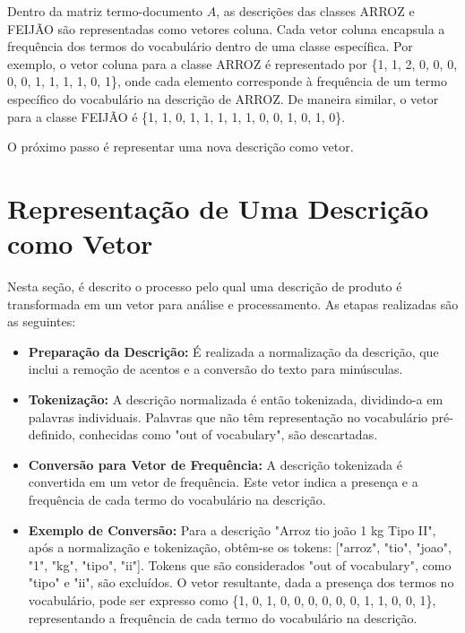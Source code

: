 Dentro da matriz termo-documento \( A \), as descrições das classes ARROZ e FEIJÃO são representadas como vetores coluna. Cada vetor coluna encapsula a frequência dos termos do vocabulário dentro de uma classe específica. Por exemplo, o vetor coluna para a classe ARROZ é representado por \{1, 1, 2, 0, 0, 0, 0, 0, 1, 1, 1, 1, 0, 1\}, onde cada elemento corresponde à frequência de um termo específico do vocabulário na descrição de ARROZ. De maneira similar, o vetor para a classe FEIJÃO é \{1, 1, 0, 1, 1, 1, 1, 1, 0, 0, 1, 0, 1, 0\}. 

O próximo passo é representar uma nova descrição como vetor.  

\section{Representação de Uma Descrição como Vetor}
\label{sec:representacao-descricao-vetor}
Nesta seção, é descrito o processo pelo qual uma descrição de produto é transformada em um vetor para análise e processamento. As etapas realizadas são as seguintes:

\begin{itemize}
    \item \textbf{Preparação da Descrição:} É realizada a normalização da descrição, que inclui a remoção de acentos e a conversão do texto para minúsculas.

    \item \textbf{Tokenização:} A descrição normalizada é então tokenizada, dividindo-a em palavras individuais. Palavras que não têm representação no vocabulário pré-definido, conhecidas como "out of vocabulary", são descartadas.

    \item \textbf{Conversão para Vetor de Frequência:} A descrição tokenizada é convertida em um vetor de frequência. Este vetor indica a presença e a frequência de cada termo do vocabulário na descrição.

    \item \textbf{Exemplo de Conversão:} Para a descrição "Arroz tio joão 1 kg Tipo II", após a normalização e tokenização, obtêm-se os tokens: ["arroz", "tio", "joao", "1", "kg", "tipo", "ii"]. Tokens que são considerados "out of vocabulary", como "tipo" e "ii", são excluídos. O vetor resultante, dada a presença dos termos no vocabulário, pode ser expresso como \{1, 0, 1, 0, 0, 0, 0, 0, 0, 1, 1, 0, 0, 1\}, representando a frequência de cada termo do vocabulário na descrição.
\end{itemize}

